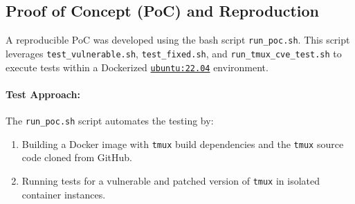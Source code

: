 \documentclass[11pt,a4paper,twocolumn]{article}
\begin{document}
\subsection*{Proof of Concept (PoC) and Reproduction}

A reproducible PoC was developed using the bash script \texttt{run\_poc.sh}. This script leverages \texttt{test\_vulnerable.sh}, \texttt{test\_fixed.sh}, and \texttt{run\_tmux\_cve\_test.sh} to execute tests within a Dockerized \href{https://hub.docker.com/layers/library/ubuntu/22.04/images/sha256-a76d0e9d99f0e91640e35824a6259c93156f0f07b7778ba05808c750e7fa6e68}{\texttt{ubuntu:22.04}} environment.

\paragraph{Test Approach:}
The \texttt{run\_poc.sh} script automates the testing by:

\begin{enumerate}
	\item Building a Docker image with \texttt{tmux} build dependencies and the \texttt{tmux} source code cloned from GitHub.
	\item Running tests for a vulnerable and patched version of \texttt{tmux} in isolated container instances.
\end{enumerate}
\end{document}
